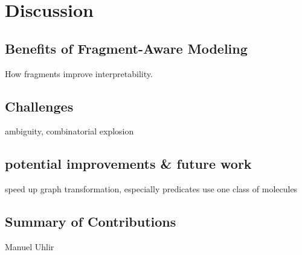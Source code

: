 \chapter{Discussion}
\section{Benefits of Fragment-Aware Modeling}
How fragments improve interpretability.
\section{Challenges}
ambiguity, combinatorial explosion
\section{potential improvements \& future work}
speed up graph transformation, especially predicates
use one class of molecules

\section{Summary of Contributions}
Manuel Uhlir